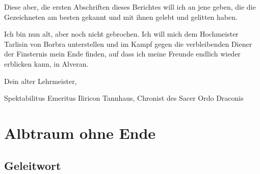 \documentclass[11pt]{scrreprt}
\begin{document}
Diese aber, die ersten Abschriften dieses Berichtes will ich an jene geben, die die Gezeichneten am besten gekannt und mit ihnen gelebt und gelitten haben.\par\medskip

Ich bin nun alt, aber noch nicht gebrochen. Ich will mich dem Hochmeister Tarlisin von Borbra unterstellen und im Kampf gegen die verbleibenden Diener der Finsternis mein Ende finden, auf dass ich meine Freunde endlich wieder erblicken kann, in Alveran.\par\medskip

Dein alter Lehrmeister,\par
Spektabilitus Emeritus Iliricon Tannhaus, Chronist des Sacer Ordo Draconis



\chapter{Albtraum ohne Ende}

\section{Geleitwort}
\end{document}
